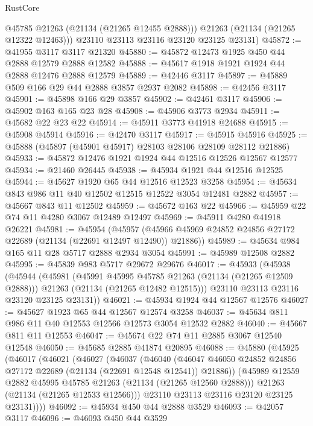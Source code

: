\begin{lexlean}{RustCore}
\begin{coremodule}
          @45785
          @21263
          (@21134 (@21265 @12455 @2888)))
        @21263
        (@21134 (@21265 @12322 @12463)))
      @23110
      @23113
      @23116
      @23120
      @23125
      @23131)
@45872 := @41955 @3117 @3117 @21320
@45880 := @45872 @12473 @1925 @450 @44 @2888 @12579 @2888 @12582
@45888 := @45617 @1918 @1921 @1924 @44 @2888 @12476 @2888 @12579
@45889 := @42446 @3117
@45897 := @45889 @509 @166 @29 @44 @2888 @3857 @2937 @2082
@45898 := @42456 @3117
@45901 := @45898 @166 @29 @3857
@45902 := @42461 @3117
@45906 := @45902 @163 @165 @23 @28
@45908 := @45906 @3773 @2934
@45911 := @45682 @22 @23 @22
@45914 := @45911 @3773 @41918 @24688
@45915 := @45908 @45914
@45916 := @42470 @3117
@45917 := @45915 @45916
@45925 := @45888 (@45897 (@45901 @45917) @28103 @28106 @28109 @28112 @21886)
@45933 := @45872 @12476 @1921 @1924 @44 @12516 @12526 @12567 @12577
@45934 := @21460 @26445
@45938 := @45934 @1921 @44 @12516 @12525
@45944 := @45627 @1920 @65 @44 @12516 @12523 @3258
@45954 := @45634 @843 @986 @11 @40 @12502 @12515 @12522 @3054 @12481 @2882
@45957 := @45667 @843 @11 @12502
@45959 := @45672 @163 @22
@45966 := @45959 @22 @74 @11 @4280 @3067 @12489 @12497
@45969 := @45911 @4280 @41918 @26221
@45981 := @45954
    (@45957 (@45966 @45969 @24852 @24856 @27172 @22689 (@21134 (@22691 @12497 @12490)) @21886))
@45989 := @45634 @984 @165 @11 @28 @5717 @2888 @2934 @3054
@45991 := @45989 @12508 @2882
@45995 := @45839 @983 @5717 @29672 @29676
@46017 := @45933
    (@45938
      (@45944
        (@45981
          (@45991 @45995 @45785 @21263 (@21134 (@21265 @12509 @2888)))
          @21263
          (@21134 (@21265 @12482 @12515)))
        @23110
        @23113
        @23116
        @23120
        @23125
        @23131))
@46021 := @45934 @1924 @44 @12567 @12576
@46027 := @45627 @1923 @65 @44 @12567 @12574 @3258
@46037 := @45634 @811 @986 @11 @40 @12553 @12566 @12573 @3054 @12532 @2882
@46040 := @45667 @811 @11 @12553
@46047 := @45674 @22 @74 @11 @2885 @3067 @12540 @12548
@46050 := @45685 @2885 @41874 @20895
@46088 := @45880
    (@45925
      (@46017
        (@46021
          (@46027
            (@46037
              (@46040
                (@46047 @46050 @24852 @24856 @27172 @22689 (@21134 (@22691 @12548 @12541)) @21886))
              (@45989 @12559 @2882 @45995 @45785 @21263 (@21134 (@21265 @12560 @2888)))
              @21263
              (@21134 (@21265 @12533 @12566)))
            @23110
            @23113
            @23116
            @23120
            @23125
            @23131))))
@46092 := @45934 @450 @44 @2888 @3529
@46093 := @42057 @3117
@46096 := @46093 @450 @44 @3529

\end{coremodule}
\end{lexlean}
